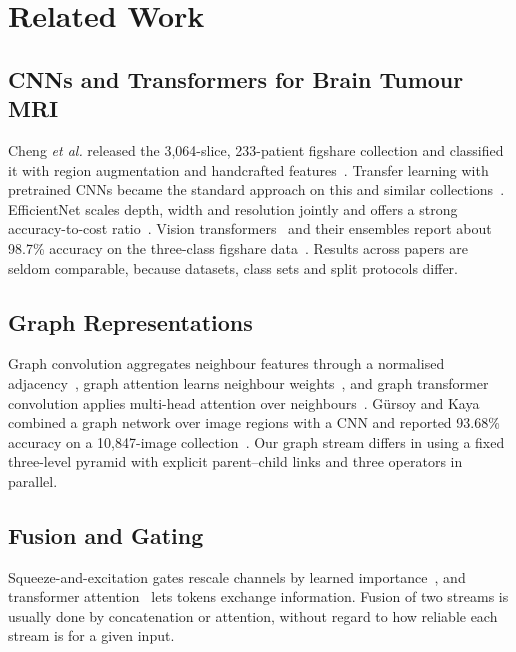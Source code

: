 \documentclass[journal,onecolumn]{IEEEtran}
\begin{document}
\section{Related Work}
\subsection{CNNs and Transformers for Brain Tumour MRI}
Cheng \textit{et al.} released the 3,064-slice, 233-patient figshare collection and classified it with region augmentation and handcrafted features~\cite{cheng2015enhanced}. Transfer learning with pretrained CNNs became the standard approach on this and similar collections~\cite{deepak2019brain,swati2019brain,badza2020classification}. EfficientNet scales depth, width and resolution jointly and offers a strong accuracy-to-cost ratio~\cite{tan2019efficientnet}. Vision transformers~\cite{dosovitskiy2021vit} and their ensembles report about 98.7\% accuracy on the three-class figshare data~\cite{tummala2022classification}. Results across papers are seldom comparable, because datasets, class sets and split protocols differ.

\subsection{Graph Representations}
Graph convolution aggregates neighbour features through a normalised adjacency~\cite{kipf2017gcn}, graph attention learns neighbour weights~\cite{velickovic2018gat}, and graph transformer convolution applies multi-head attention over neighbours~\cite{shi2021masked}. G\"{u}rsoy and Kaya combined a graph network over image regions with a CNN and reported 93.68\% accuracy on a 10,847-image collection~\cite{gursoy2024braingcn}. Our graph stream differs in using a fixed three-level pyramid with explicit parent--child links and three operators in parallel.

\subsection{Fusion and Gating}
Squeeze-and-excitation gates rescale channels by learned importance~\cite{hu2018senet}, and transformer attention~\cite{vaswani2017attention} lets tokens exchange information. Fusion of two streams is usually done by concatenation or attention, without regard to how reliable each stream is for a given input.
\end{document}
